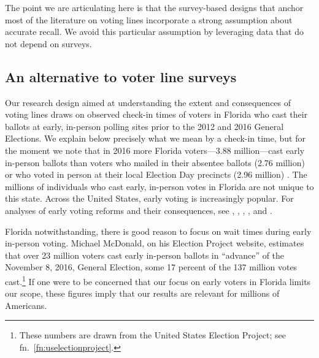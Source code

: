 \documentclass[12pt,titlepage]{article}
\begin{document}
The point we are articulating here is that the survey-based designs
that anchor most of the literature on voting lines incorporate a
strong assumption about accurate recall. We avoid this particular
assumption by leveraging data that do not depend on surveys.

\subsection*{An alternative to voter line surveys}

Our research design aimed at understanding the extent and consequences
of voting lines draws on \mbox{observed} check-in times of voters in Florida
who cast their ballots at early, in-person polling sites prior to the
2012 and 2016 General Elections. We explain below precisely what we
mean by a check-in time, but for the moment we note that in 2016 more
Florida voters---3.88 million---cast early in-person ballots than
voters who mailed in their absentee ballots (2.76 million) or who
voted in person at their local Election Day precincts (2.96 million)
\citep{FDOS:2016vote}. The millions of individuals who cast early,
in-person votes in Florida are not unique to this state. Across the
United States, early voting is increasingly popular. For analyses of
early voting reforms and their consequences, see
\citet{neelyrichardson:earlyvoting}, \citet{gronkebaum:growth},
\citet{gronketoffey:psychological}, \citet{gronke:2012}, and
\citet{burdenetal:unanticipated}.




Florida notwithstanding, there is good reason to focus on wait times
during early in-person voting. Michael McDonald, on his Election
Project website, estimates that over 23 million voters cast early
in-person ballots in ``advance'' of the November 8, 2016, General
Election, some 17 percent of the 137 million votes
cast.\footnote{These numbers are drawn from the United States Election
  Project; see fn.\ \ref{fn:uselectionproject}.} If one were to be
concerned that our focus on early voters in Florida limits our scope,
these figures imply that our results are relevant for millions of
Americans.

\end{document}
